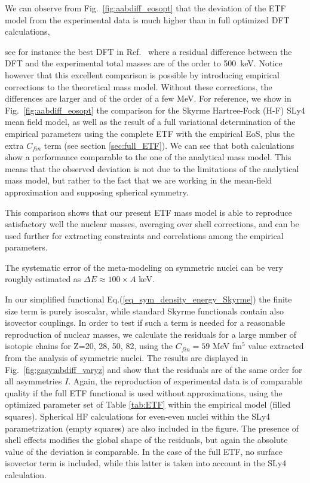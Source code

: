 \documentclass
[aps,prc,twocolumn,showpacs,showkeys,amsmath,floatfix,superscriptaddress]{revtex4}
\begin{document}
{We can observe from Fig.~\ref{fig:aabdiff_eosopt} that  the deviation of the ETF model from the experimental data is much higher than in full optimized DFT calculations, {see for instance the best DFT in Ref.~\cite{goriely} where a residual difference between the DFT and the experimental total masses are of the order to 500~keV. Notice however that this excellent comparison is possible by introducing empirical corrections to the theoretical mass model.
Without these corrections, the differences are larger and of the order of a few MeV.
For reference, we show in Fig.~\ref{fig:aabdiff_eosopt} the comparison for the Skyrme Hartree-Fock (H-F) SLy4 mean field model, as well as the result of a full variational determination of the empirical parameters using the complete ETF with the empirical EoS, plus the extra $C_{fin}$ term (see section \ref{sec:full_ETF}). We can see that both calculations show a performance comparable to the one of the analytical mass model. 
This means that the observed deviation is not due to the limitations of the analytical mass model, but rather to the fact that we are working in the mean-field approximation and supposing spherical symmetry. 

{This comparison shows that our present ETF mass model is able to reproduce satisfactory well the nuclear masses, averaging over shell corrections, and can be used further for extracting constraints and correlations
among the empirical parameters.}

The systematic error of the meta-modeling on symmetric nuclei can be very roughly 
estimated as $\Delta E \approx 100 \times A$ keV. 
 



In our simplified functional Eq.(\ref{eq_sym_density_energy_Skyrme}) the finite size term is purely isoscalar, while standard Skyrme functionals contain also isovector couplings. 
In order to test if such a term is needed for a reasonable reproduction of nuclear masses,
we calculate the residuals for a large number of isotopic chains for Z=20, 28, 50, 82, using the $C_{fin}=59$ MeV fm$^5$ value extracted from the analysis of symmetric nuclei. 
The results are displayed
in Fig.~\ref{fig:gasymbdiff_varyz}  and show that the residuals are of the same order for all asymmetries $I$. 
Again, the reproduction of experimental data is of comparable quality if the full ETF functional is used without approximations, using  the optimized parameter set of Table \ref{tab:ETF} within the empirical model (filled squares). Spherical HF calculations for even-even nuclei within the SLy4 parametrization \cite{Sly4} (empty squares) are also included in the figure. The presence of shell effects modifies the global shape of the residuals, but again the absolute value of the deviation is comparable.
In the case of the full ETF, no surface isovector term is included, while this latter is taken into account in the SLy4 calculation.

}}
\end{document}
